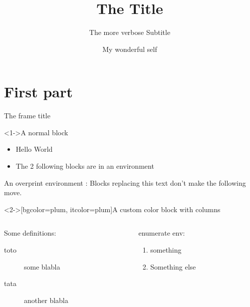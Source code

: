\documentclass[presentation, aspectratio=169]{beamer}
\author{My wonderful self}
\date{\mydate}
\title{The Title}
\subtitle{The more verbose Subtitle}
\begin{document}
\maketitle

\part{First part}

\begin{frame}{The frame title}

  \begin{block}<1->{A normal block}
    \begin{itemize}
    \item Hello World
    \item The 2 following blocks are in an  environment
    \end{itemize}
  \end{block}

  \begin{overprint}

    An overprint environment : Blocks replacing this text don't make the following move.
    

    \begin{customblock}<2->[bgcolor=plum, itcolor=plum]{A custom color block with columns}
      \begin{columns}
        \begin{column}{0.6\columnwidth}
          Some definitions:
          \begin{description}
          \item[{toto}] some blabla
          \item[{tata}] another blabla
          \end{description}
        \end{column}

        \begin{column}{0.3\columnwidth}
          enumerate env:
          \begin{enumerate}
          \item something
          \item Something else
          \end{enumerate}
        \end{column}
      \end{columns}
    \end{customblock}


\end{overprint}
\end{frame}
\end{document}
